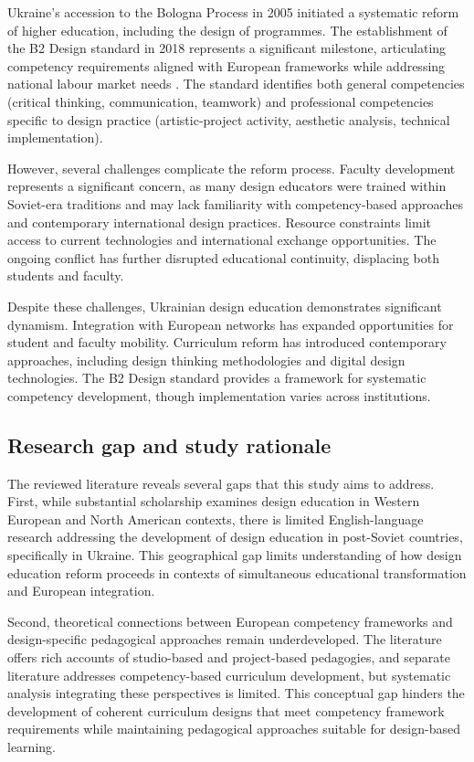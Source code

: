 \documentclass[ed]{acnsart}
\begin{document}
	Ukraine's accession to the Bologna Process in 2005 initiated a systematic reform of higher education, including the design of programmes. The establishment of the B2 Design standard in 2018 represents a significant milestone, articulating competency requirements aligned with European frameworks while addressing national labour market needs \cite{MON2018}. The standard identifies both general competencies (critical thinking, communication, teamwork) and professional competencies specific to design practice (artistic-project activity, aesthetic analysis, technical implementation).
	
	However, several challenges complicate the reform process. Faculty development represents a significant concern, as many design educators were trained within Soviet-era traditions and may lack familiarity with competency-based approaches and contemporary international design practices. Resource constraints limit access to current technologies and international exchange opportunities. The ongoing conflict has further disrupted educational continuity, displacing both students and faculty.
	
	Despite these challenges, Ukrainian design education demonstrates significant dynamism. Integration with European networks has expanded opportunities for student and faculty mobility. Curriculum reform has introduced contemporary approaches, including design thinking methodologies and digital design technologies. The B2 Design standard provides a framework for systematic competency development, though implementation varies across institutions.
	
	\subsection{Research gap and study rationale}
	
	The reviewed literature reveals several gaps that this study aims to address. First, while substantial scholarship examines design education in Western European and North American contexts, there is limited English-language research addressing the development of design education in post-Soviet countries, specifically in Ukraine. This geographical gap limits understanding of how design education reform proceeds in contexts of simultaneous educational transformation and European integration.
	
	Second, theoretical connections between European competency frameworks and design-specific pedagogical approaches remain underdeveloped. The literature offers rich accounts of studio-based and project-based pedagogies, and separate literature addresses competency-based curriculum development, but systematic analysis integrating these perspectives is limited. This conceptual gap hinders the development of coherent curriculum designs that meet competency framework requirements while maintaining pedagogical approaches suitable for design-based learning.
	
\end{document}
